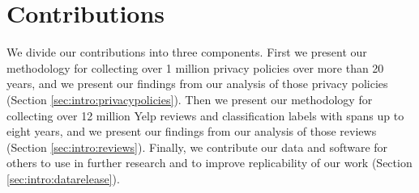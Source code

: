 


\section{Contributions}

We divide our contributions into three components. First we present our methodology for collecting over 1 million privacy policies over more than 20 years, and we present our findings from our analysis of those privacy policies (Section \ref{sec:intro:privacypolicies}). Then we present our methodology for collecting over 12 million Yelp reviews and classification labels with spans up to eight years, and we present our findings from our analysis of those reviews (Section \ref{sec:intro:reviews}). Finally, we contribute our data and software for others to use in further research and to improve replicability of our work (Section \ref{sec:intro:datarelease}).


